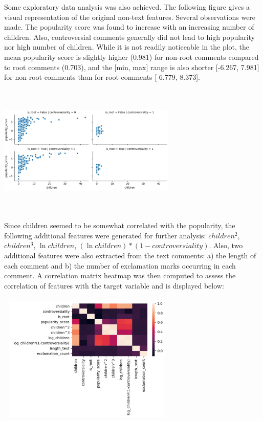 \documentclass[11pt]{article}
\begin{document}
Some exploratory data analysis was also achieved. The following figure gives a visual representation of the original non-text features. Several observations were made. The popularity score was found to increase with an increasing number of children. Also, controversial comments generally did not lead to high popularity nor high number of children. While it is not readily noticeable in the plot, the mean popularity score is slightly higher (0.981) for non-root comments compared to root comments (0.703), and the [min, max] range is also shorter [-6.267, 7.981] for non-root comments than for root comments [-6.779, 8.373]. \\
\\
\includegraphics[width=8.5cm, height=6cm]{EDA-1}\\
\\
Since children seemed to be somewhat correlated with the popularity, the following additional features were generated for further analysis: $children^{2}$, $children^{3}$, $ \ln children$, $(\ln children)*(1-controversiality)$. Also, two additional features were also extracted from the text comments: a) the length of each comment and b) the number of exclamation marks occurring in each comment. A correlation matrix heatmap was then computed to assess the correlation of features with the target variable and is displayed below: \\
\\
\includegraphics[width=8.5cm, height=6cm]{EDA-4}\\
\end{document}
